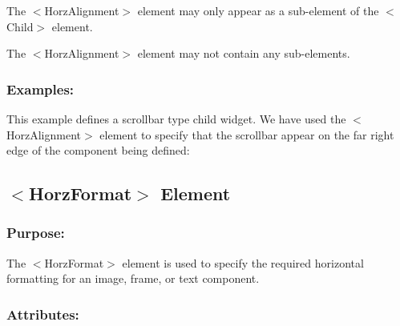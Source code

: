 \begin{DoxyItemize}
\item The {\ttfamily $<$Horz\+Alignment$>$} element may only appear as a sub-\/element of the {\ttfamily $<$Child$>$} element. 
\item The {\ttfamily $<$Horz\+Alignment$>$} element may not contain any sub-\/elements. 
\end{DoxyItemize}\hypertarget{fal_element_ref_fal_elem_ref_sec_15_4}{}\subsubsection{Examples\+:}\label{fal_element_ref_fal_elem_ref_sec_15_4}
This example defines a scrollbar type child widget. We have used the {\ttfamily $<$Horz\+Alignment$>$} element to specify that the scrollbar appear on the far right edge of the component being defined\+: 
\begin{DoxyCode}{0}
\end{DoxyCode}
\hypertarget{fal_element_ref_fal_elem_ref_sec_16}{}\subsection{$<$\+Horz\+Format$>$ Element}\label{fal_element_ref_fal_elem_ref_sec_16}
\hypertarget{fal_element_ref_fal_elem_ref_sec_16_1}{}\subsubsection{Purpose\+:}\label{fal_element_ref_fal_elem_ref_sec_16_1}
The {\ttfamily $<$Horz\+Format$>$} element is used to specify the required horizontal formatting for an image, frame, or text component.\hypertarget{fal_element_ref_fal_elem_ref_sec_16_2}{}\subsubsection{Attributes\+:}\label{fal_element_ref_fal_elem_ref_sec_16_2}

